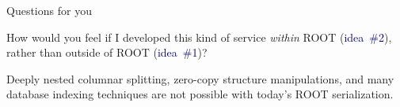 \documentclass[aspectratio=169]{beamer}
\begin{document}
\begin{frame}{Questions for you}
\vspace{0.5 cm}
\begin{description}\setlength{\itemsep}{0.5 cm}
\item[Question:] How would you feel if I developed this kind of service {\it within} ROOT (\textcolor{darkblue}{idea~\#2}), rather than outside of ROOT (\textcolor{darkblue}{idea~\#1})?

\vspace{0.25 cm}

\item[Question:]<3-> Deeply nested columnar splitting, zero-copy structure manipulations, and many database indexing techniques are not possible with today's ROOT serialization.

\vspace{0.25 cm}

\vspace{0.25 cm}
\end{description}
\end{frame}
\end{document}
